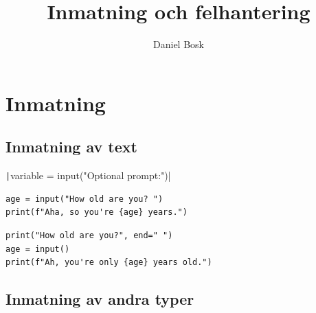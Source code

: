 \title{%
  Inmatning och felhantering
}
\author{Daniel Bosk}


\mode*

\begin{abstract}
  
\end{abstract}


\section{Inmatning}

\subsection{Inmatning av text}

\begin{frame}
  \begin{center}
    \texttt|variable = input("Optional prompt:")|
  \end{center}
\end{frame}

\begin{frame}[fragile]
  \begin{example}
    \begin{verbatim}
age = input("How old are you? ")
print(f"Aha, so you're {age} years.")
    \end{verbatim}
  \end{example}

  \pause

  \begin{example}
    \begin{verbatim}
print("How old are you?", end=" ")
age = input()
print(f"Ah, you're only {age} years old.")
    \end{verbatim}
  \end{example}
\end{frame}

\subsection{Inmatning av andra typer}

